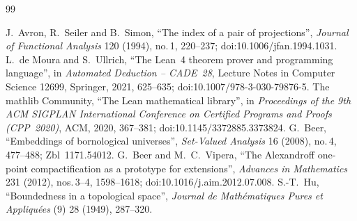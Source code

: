 \documentclass[11pt]{article}
\newcommand{\q}[1]{“#1”}
\theoremstyle{plain}
\theoremstyle{definition}
\theoremstyle{remark}
\renewcommand{\_}{\bkunderscore\allowbreak}
\begin{document}
\begin{thebibliography}{99}\small\raggedright
{} J.~Avron, R.~Seiler and B.~Simon, \q{The index of a pair of projections}, \emph{Journal of Functional Analysis} 120 (1994), no.\,1, 220--237; doi:10.1006/jfan.1994.1031.
 L.~de Moura and S.~Ullrich, \q{The Lean~4 theorem prover and programming language}, in \emph{Automated Deduction -- CADE~28}, Lecture Notes in Computer Science 12699, Springer, 2021, 625--635; doi:10.1007/978-3-030-79876-5\_37.
 The mathlib Community, \q{The Lean mathematical library}, in \emph{Proceedings of the 9th ACM SIGPLAN International Conference on Certified Programs and Proofs (CPP~2020)}, ACM, 2020, 367--381; doi:10.1145/3372885.3373824.
 G.~Beer, \q{Embeddings of bornological universes}, \emph{Set-Valued Analysis} 16 (2008), no.\,4, 477--488; Zbl~1171.54012.
 G.~Beer and M.~C.~Vipera, \q{The Alexandroff one-point compactification as a prototype for extensions}, \emph{Advances in Mathematics} 231 (2012), nos.\,3--4, 1598--1618; doi:10.1016/j.aim.2012.07.008.
 S.-T.~Hu, \q{Boundedness in a topological space}, \emph{Journal de Mathématiques Pures et Appliquées} (9) 28 (1949), 287--320.
\end{thebibliography}
\end{document}
